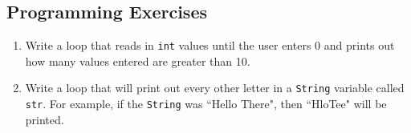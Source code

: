 \subsection{Programming Exercises}

\setcounter{counter}{1}
\begin{enumerate}[label={\arabic{counter}\addtocounter{counter}{1}}.]

\item Write a loop that reads in \verb|int| values until the user enters 0 and prints out how many values entered are greater than 10.

\item Write a loop that will print out every other letter in a \verb|String| variable called \verb|str|. For example, if the \verb|String| was ``Hello There", then ``HloTee" will be printed.

\end{enumerate}